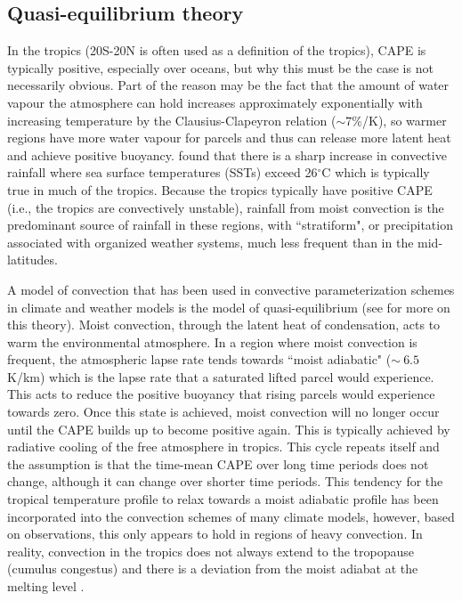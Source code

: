 \documentclass[letterpaper,12pt,titlepage,oneside,final]{book}
\begin{document}
\subsection{Quasi-equilibrium theory}

In the tropics (20S-20N is often used as a definition of the tropics), CAPE is typically positive, especially over oceans, but why this must be the case is not necessarily obvious. Part of the reason may be the fact that the amount of water vapour the atmosphere can hold increases approximately exponentially with increasing temperature by the Clausius-Clapeyron relation ($\sim{7\%}$/K), so warmer regions have more water vapour for parcels and thus can release more latent heat and achieve positive buoyancy. \cite{folkins_ian_tropical_2003} found that there is a sharp increase in convective rainfall where sea surface temperatures (SSTs) exceed 26$^{\circ}$C which is typically true in much of the tropics. Because the tropics typically have positive CAPE (i.e., the tropics are convectively unstable), rainfall from moist convection is the predominant source of rainfall in these regions, with ``stratiform", or precipitation associated with organized weather systems, much less frequent than in the mid-latitudes.

A model of convection that has been used in convective parameterization schemes in climate and weather models is the model of quasi-equilibrium \cite{arakawa_and_schubert_interaction_1974} (see \cite{emanuel_quasi-equilibrium_2007} for more on this theory). Moist convection, through the latent heat of condensation, acts to warm the environmental atmosphere. In a region where moist convection is frequent, the atmospheric lapse rate tends towards ``moist adiabatic" ($\sim{~6.5}$K/km) which is the lapse rate that a saturated lifted parcel would experience. This acts to reduce the positive buoyancy that rising parcels would experience towards zero. Once this state is achieved, moist convection will no longer occur until the CAPE builds up to become positive again. This is typically achieved by radiative cooling of the free atmosphere in tropics. This cycle repeats itself and the assumption is that the time-mean CAPE over long time periods does not change, although it can change over shorter time periods. This tendency for the tropical temperature profile to relax towards a moist adiabatic profile has been incorporated into the convection schemes of many climate models, however, based on observations, this only appears to hold in regions of heavy convection. In reality, convection in the tropics does not always extend to the tropopause (cumulus congestus) and there is a deviation from the moist adiabat at the melting level \cite{folkins_melting_2013}.
\end{document}
